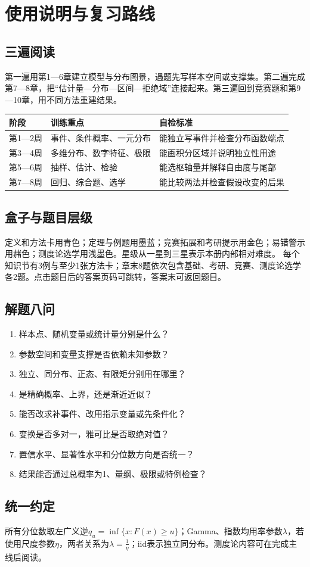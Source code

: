 \chapter{使用说明与复习路线}
\section*{三遍阅读}
第一遍用第1—6章建立模型与分布图景，遇题先写样本空间或支撑集。第二遍完成第7—8章，把“估计量—分布—区间—拒绝域”连接起来。第三遍回到竞赛题和第9—10章，用不同方法重建结果。
\begin{center}\small
\begin{tabularx}{\textwidth}{@{}lXX@{}}\toprule
阶段&训练重点&自检标准\\\midrule
第1—2周&事件、条件概率、一元分布&能独立写事件并检查分布函数端点\\
第3—4周&多维分布、数字特征、极限&能画积分区域并说明独立性用途\\
第5—6周&抽样、估计、检验&能选枢轴量并解释自由度与尾部\\
第7—8周&回归、综合题、选学&能比较两法并检查假设改变的后果\\\bottomrule
\end{tabularx}\end{center}
\section*{盒子与题目层级}
定义和方法卡用青色；定理与例题用墨蓝；竞赛拓展和考研提示用金色；易错警示用赭色；测度论选学用浅墨色。星级从一星到三星表示本册内部相对难度。
每个知识节有3例与至少1张方法卡；章末8题依次包含基础、考研、竞赛、测度论选学各2题。点击题目后的答案页码可跳转，答案末可返回题目。
\section*{解题八问}
\begin{enumerate}
\item 样本点、随机变量或统计量分别是什么？
\item 参数空间和变量支撑是否依赖未知参数？
\item 独立、同分布、正态、有限矩分别用在哪里？
\item 是精确概率、上界，还是渐近近似？
\item 能否改求补事件、改用指示变量或先条件化？
\item 变换是否多对一，雅可比是否取绝对值？
\item 置信水平、显著性水平和分位数方向是否统一？
\item 结果能否通过总概率为1、量纲、极限或特例检查？
\end{enumerate}
\section*{统一约定}
所有分位数取左广义逆$q_u=\inf\{x:F(x)\ge u\}$；Gamma、指数均用率参数$\lambda$，若使用尺度参数$\eta$，两者关系为$\lambda=\frac{1}{\eta}$；iid表示独立同分布。测度论内容可在完成主线后阅读。
